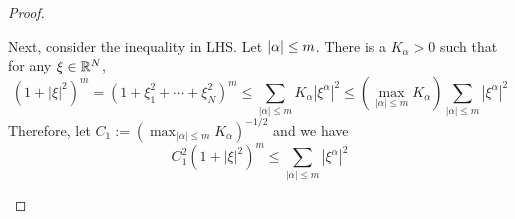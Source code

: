 \begin{proof}
\begin{enumerate}[label=(\Roman{*})]
\begin{equation*}
		\end{equation*}
		Next, consider the inequality in LHS. Let $\left\lvert\alpha\right\lvert \leq m$. There is a $K_\alpha > 0$ such that for any $\xi \in \mathbb{R}^N$,
		\begin{equation*}
			\left(1+|\xi|^2\right)^m=\left(1+\xi_1^2+\cdots+\xi_N^2\right)^m \leq \sum_{|\alpha| \leq m} K_\alpha\left|\xi^\alpha\right|^2 \leq\left(\max _{|\alpha| \leq m} K_\alpha\right) \sum_{|\alpha| \leq m}\left|\xi^\alpha\right|^2
		\end{equation*}
		Therefore, let $C_1:=\left(\max _{|\alpha| \leq m} K_\alpha\right)^{-1 / 2}$ and we have
		\begin{equation*}
			C_1^2\left(1+|\xi|^2\right)^m \leq \sum_{|\alpha| \leq m}\left|\xi^\alpha\right|^2
		\end{equation*}


\end{enumerate}
\end{proof}
